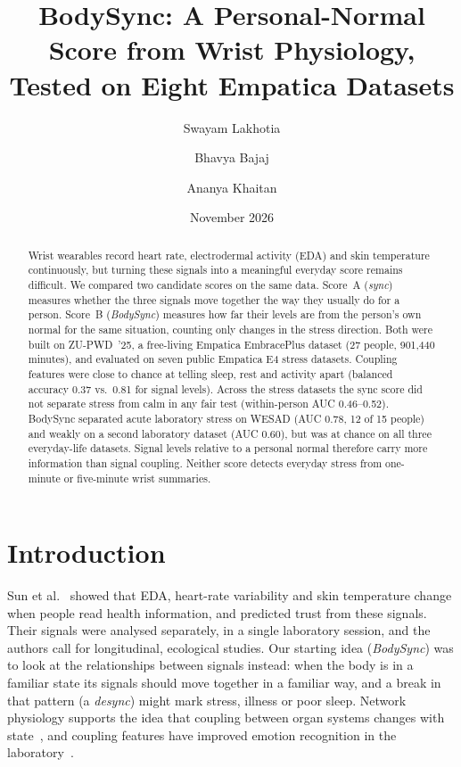 \documentclass{article}
\title{BodySync: A Personal-Normal Score from Wrist Physiology,\\Tested on Eight Empatica Datasets}
\author{Swayam Lakhotia \and Bhavya Bajaj \and Ananya Khaitan}
\date{November 2026}
\begin{document}
\maketitle

\begin{abstract}
Wrist wearables record heart rate, electrodermal activity (EDA) and skin temperature continuously, but turning these signals into a meaningful everyday score remains difficult. We compared two candidate scores on the same data. Score~A (\emph{sync}) measures whether the three signals move together the way they usually do for a person. Score~B (\emph{BodySync}) measures how far their levels are from the person's own normal for the same situation, counting only changes in the stress direction. Both were built on ZU-PWD~'25, a free-living Empatica EmbracePlus dataset (27 people, 901{,}440 minutes), and evaluated on seven public Empatica E4 stress datasets. Coupling features were close to chance at telling sleep, rest and activity apart (balanced accuracy 0.37 vs.\ 0.81 for signal levels). Across the stress datasets the sync score did not separate stress from calm in any fair test (within-person AUC 0.46--0.52). BodySync separated acute laboratory stress on WESAD (AUC 0.78, 12 of 15 people) and weakly on a second laboratory dataset (AUC 0.60), but was at chance on all three everyday-life datasets. Signal levels relative to a personal normal therefore carry more information than signal coupling. Neither score detects everyday stress from one-minute or five-minute wrist summaries.
\end{abstract}

\section{Introduction}

Sun et al.~\cite{sun2026trust} showed that EDA, heart-rate variability and skin temperature change when people read health information, and predicted trust from these signals. Their signals were analysed separately, in a single laboratory session, and the authors call for longitudinal, ecological studies. Our starting idea (\emph{BodySync}) was to look at the relationships between signals instead: when the body is in a familiar state its signals should move together in a familiar way, and a break in that pattern (a \emph{desync}) might mark stress, illness or poor sleep. Network physiology supports the idea that coupling between organ systems changes with state~\cite{bashan2012network}, and coupling features have improved emotion recognition in the laboratory~\cite{valenza2013coupling}.
\end{document}
